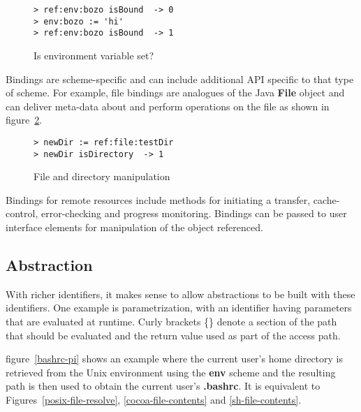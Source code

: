 \documentclass[preprint,authoryear]{acm_proc_article-sp}
\begin{document}
\begin{figure}[htbp]
\begin{center}
\begin{small}
\begin{verbatim}
> ref:env:bozo isBound  -> 0
> env:bozo := 'hi'
> ref:env:bozo isBound  -> 1
\end{verbatim}
\end{small}
\caption{Is environment variable set?}
\label{isBound}
\end{center}
\end{figure}

Bindings are scheme-specific and can include additional API specific to that type of scheme.
For example, file bindings are analogues of the Java {\bf File} object and can deliver
meta-data about and perform operations on the file as shown in figure~\ref{ref-file-dir}.

\begin{figure}[h]
\begin{center}
\begin{small}
\begin{verbatim}
> newDir := ref:file:testDir 
> newDir isDirectory  -> 1
\end{verbatim}
\end{small}
\caption{File and directory manipulation}
\label{ref-file-dir}
\end{center}
\end{figure}



Bindings for remote resources include methods for initiating a transfer, cache-control,
error-checking and progress monitoring.   Bindings can be passed to user interface
elements for manipulation of the object referenced.



\subsection{Abstraction}

With richer identifiers, it makes sense to allow abstractions to be built with these identifiers.
One example is parametrization, with an identifier having parameters that are evaluated
at runtime.  Curly brackets \{\} denote a section of the path that should be evaluated and
the return value used as part of the access path.

figure~\ref{bashrc-pi} shows an example where the current user's home directory
is retrieved from the Unix environment using the {\bf env} scheme and the resulting
path is then used to obtain the current user's  {\bf .bashrc}.
It is equivalent to Figures~\ref{posix-file-resolve}, \ref{cocoa-file-contents} and 
\ref{sh-file-contents}.
\end{document}
